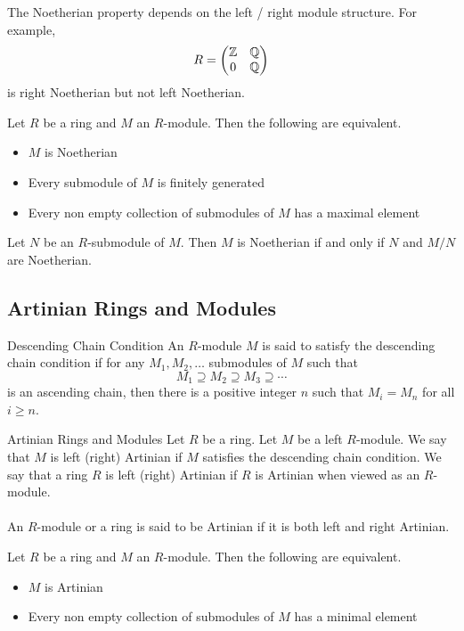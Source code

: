 \documentclass[a4paper]{article}
\begin{document}
The Noetherian property depends on the left / right module structure. For example, $$R=\begin{pmatrix}
\mathbb{Z} & \mathbb{Q}\\
0 & \mathbb{Q}
\end{pmatrix}$$ is right Noetherian but not left Noetherian. 

\begin{prp}{}{} Let $R$ be a ring and $M$ an $R$-module. Then the following are equivalent. 
\begin{itemize}
\item $M$ is Noetherian
\item Every submodule of $M$ is finitely generated
\item Every non empty collection of submodules of $M$ has a maximal element
\end{itemize}
\end{prp}

\begin{prp}{}{} Let $N$ be an $R$-submodule of $M$. Then $M$ is Noetherian if and only if $N$ and $M/N$ are Noetherian. 
\end{prp}

\subsection{Artinian Rings and Modules}
\begin{defn}{Descending Chain Condition}{} An $R$-module $M$ is said to satisfy the descending chain condition if for any $M_1,M_2,\dots$ submodules of $M$ such that $$M_1\supseteq M_2\supseteq M_3\supseteq\cdots$$ is an ascending chain, then there is a positive integer $n$ such that $M_i=M_n$ for all $i\geq n$. 
\end{defn}

\begin{defn}{Artinian Rings and Modules}{} Let $R$ be a ring. Let $M$ be a left $R$-module. We say that $M$ is left (right) Artinian if $M$ satisfies the descending chain condition. We say that a ring $R$ is left (right) Artinian if $R$ is Artinian when viewed as an $R$-module. \\~\\

An $R$-module or a ring is said to be Artinian if it is both left and right Artinian. 
\end{defn}

\begin{prp}{}{} Let $R$ be a ring and $M$ an $R$-module. Then the following are equivalent. 
\begin{itemize}
\item $M$ is Artinian
\item Every non empty collection of submodules of $M$ has a minimal element
\end{itemize}
\end{prp}
\end{document}
